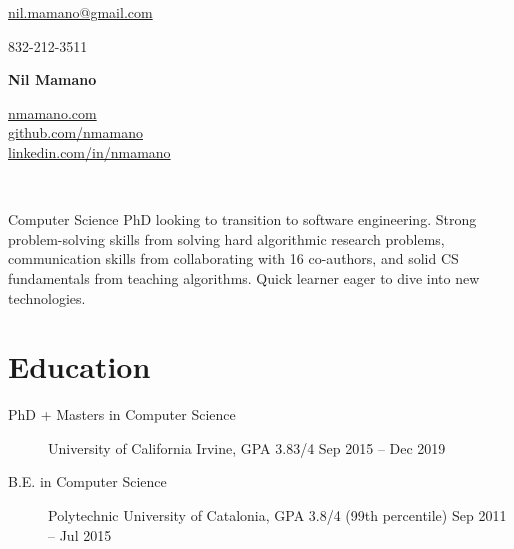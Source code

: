 \documentclass[letterpaper,10pt,oneside]{article}
\begin{document}
{\raggedleft

\begin{minipage}[c]{0.28\textwidth}
	\begin{flushleft}
	\href{mailto:nil.mamano@gmail.com}{nil.mamano@gmail.com}\\
\begin{comment}
	 Dunlavy St\\
	Houston, Texas 77006, US\\
\end{comment}
	832-212-3511
	\end{flushleft}
\end{minipage}\hfill
\begin{minipage}[c]{0.3\textwidth}
	\begin{center}
		\Huge{\textbf{Nil Mamano}}
	\end{center}
\end{minipage}\hfill
\begin{minipage}[c]{0.3\textwidth}
	\begin{flushright}
	\href{http://www.nmamano.com}{nmamano.com} \\
	\href{http://www.github.com/nmamano}{github.com/nmamano} \\
	\href{http://www.linkedin.com/in/nmamano}{linkedin.com/in/nmamano}
	\end{flushright}
\end{minipage}\\
\vspace{5px}
\hrulefill
}
\vspace{7px}

\noindent Computer Science PhD looking to transition to software engineering. Strong problem-solving skills from solving hard algorithmic research problems, communication skills from collaborating with 16 co-authors, and solid CS fundamentals from teaching algorithms. Quick learner eager to dive into new technologies. %

\section*{Education}
\begin{description}
\item[PhD + Masters in Computer Science]\quad University of California Irvine, GPA 3.83/4 \hfill Sep 2015 -- Dec 2019
\item[B.E. in Computer Science]\quad Polytechnic University of Catalonia, GPA 3.8/4 (99th percentile) \hfill Sep 2011 -- Jul 2015
\end{description}
\end{document}
